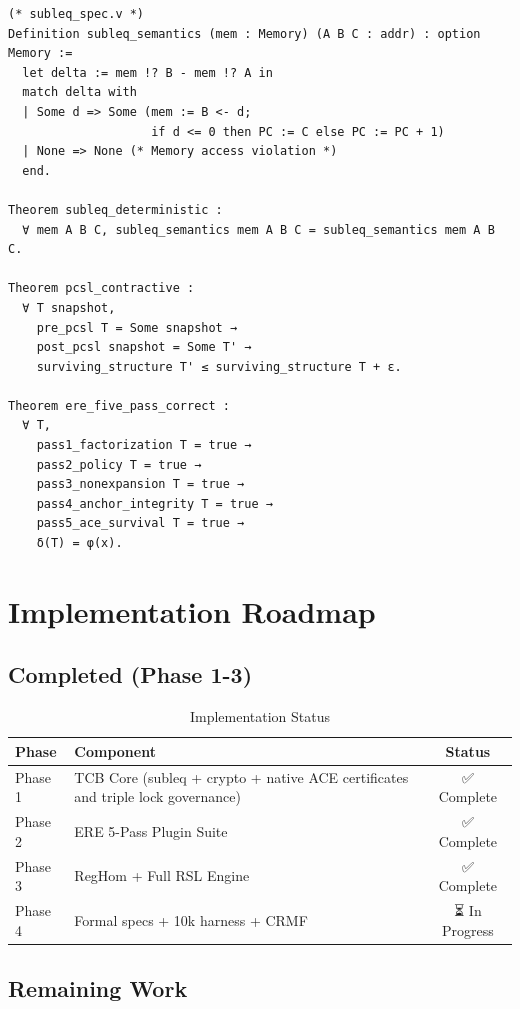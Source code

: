 \documentclass[11pt,a4paper]{article}
\begin{document}
\begin{lstlisting}[caption={Coq SUBLEQ Semantics}, label=lst:coq]
(* subleq_spec.v *)
Definition subleq_semantics (mem : Memory) (A B C : addr) : option Memory :=
  let delta := mem !? B - mem !? A in
  match delta with
  | Some d => Some (mem := B <- d; 
                    if d <= 0 then PC := C else PC := PC + 1)
  | None => None (* Memory access violation *)
  end.

Theorem subleq_deterministic :
  ∀ mem A B C, subleq_semantics mem A B C = subleq_semantics mem A B C.

Theorem pcsl_contractive :
  ∀ T snapshot,
    pre_pcsl T = Some snapshot →
    post_pcsl snapshot = Some T' →
    surviving_structure T' ≤ surviving_structure T + ε.

Theorem ere_five_pass_correct :
  ∀ T,
    pass1_factorization T = true →
    pass2_policy T = true →
    pass3_nonexpansion T = true →
    pass4_anchor_integrity T = true →
    pass5_ace_survival T = true →
    δ(T) = φ(x).
\end{lstlisting}

\section{Implementation Roadmap}

\subsection{Completed (Phase 1-3)}

\begin{table}[h]
\centering
\caption{Implementation Status}
\label{tab:implementation_status}
\begin{tabular}{@{}l l c@{}}
\toprule
\textbf{Phase} & \textbf{Component} & \textbf{Status} \\
\midrule
Phase 1 & TCB Core (subleq + crypto + native ACE certificates and triple lock governance) & ✅ Complete \\
Phase 2 & ERE 5-Pass Plugin Suite & ✅ Complete \\
Phase 3 & RegHom + Full RSL Engine & ✅ Complete \\
Phase 4 & Formal specs + 10k harness + CRMF & ⏳ In Progress \\
\bottomrule
\end{tabular}
\end{table}

\subsection{Remaining Work}
\end{document}

